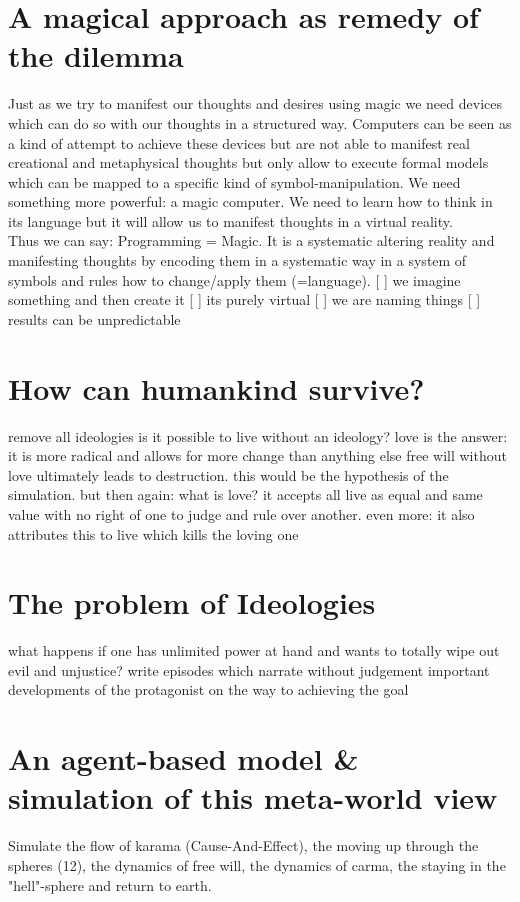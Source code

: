 \documentclass[twocolumn]{article}
\begin{document}
\section{A magical approach as remedy of the dilemma}
Just as we try to manifest our thoughts and desires using magic we need devices which can do so with our thoughts in a structured way. Computers can be seen as a kind of attempt to achieve these devices but are not able to manifest real creational and metaphysical thoughts but only allow to execute formal models which can be mapped to a specific kind of symbol-manipulation. We need something more powerful: a magic computer. We need to learn how to think in its language but it will allow us to manifest thoughts in a virtual reality. \\
Thus we can say: Programming = Magic. It is a systematic altering reality and manifesting thoughts by encoding them in a systematic way in a system of symbols and rules how to change/apply them (=language).
[ ] we imagine something and then create it
[ ] its purely virtual
[ ] we are naming things
[ ] results can be unpredictable

\section{How can humankind survive?}
remove all ideologies
is it possible to live without an ideology?
love is the answer: it is more radical and allows for more change than anything else
free will without love ultimately leads to destruction. this would be the hypothesis of the simulation. 
but then again: what is love? it accepts all live as equal and same value with no right of one to judge and rule over another. even more: it also attributes this to live which kills the loving one

\section{The problem of Ideologies}
what happens if one has unlimited power at hand and wants to totally wipe out evil and unjustice?
write episodes which narrate without judgement important developments of the protagonist on the way to achieving the goal

\section{An agent-based model \& simulation of this meta-world view}
Simulate the flow of karama (Cause-And-Effect), the moving up through the spheres (12), the dynamics of free will, the dynamics of carma, the staying in the "hell"-sphere and return to earth.



\end{document}
